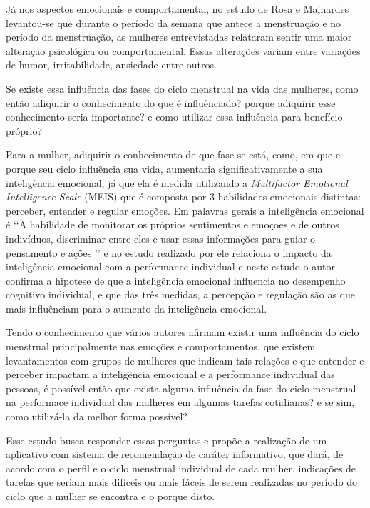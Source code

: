 Já nos aspectos emocionais e comportamental, no estudo de Rosa e Mainardes levantou-se que durante o período da semana que antece a menstruação e no período da menstruação, as mulheres entrevistadas relataram sentir uma maior alteração psicológica ou comportamental. Essas alterações variam entre variações de humor, irritabilidade, ansiedade entre outros.

Se existe essa influência das fases do ciclo menstrual na vida das mulheres, como então adiquirir o conhecimento do que é influênciado? porque adiquirir esse conhecimento seria importante? e como utilizar essa influência para benefício próprio?

Para a mulher, adiquirir o conhecimento de que fase se está, como, em que e porque seu ciclo influência sua vida, aumentaria significativamente a sua inteligência emocional, já que ela é medida utilizando a \textit{Multifactor Emotional Intelligence Scale} (MEIS) que é composta por 3 habilidades emocionais distintas: perceber, entender e regular emoções. Em palavras gerais a inteligência emocional é \lq \lq A habilidade de monitorar os próprios sentimentos e emoçoes e de outros indivíduos, discriminar entre eles e usar essas informações para guiar o pensamento e ações \rq \rq \cite{salovey1990} e no estudo realizado por  ele relaciona o impacto da inteligência emocional com a performance individual e neste estudo o autor confirma a hipotese de que a inteligência emocional influencia no desempenho cognitivo individual, e que das três medidas, a percepção e regulação são as que mais influênciam para o aumento da inteligência emocional.
  

Tendo o conhecimento que vários autores afirmam existir uma influência do ciclo menstrual principalmente nas emoções e comportamentos, que existem levantamentos com grupos de mulheres que indicam tais relações e que entender e perceber impactam a inteligência emocional e a performance individual das pessoas, é possível então que exista alguma influência da fase do ciclo menstrual na performace individual das mulheres em algumas tarefas cotidianas? e se sim, como utilizá-la da melhor forma possível? 

Esse estudo busca responder essas perguntas e propõe a realização de um aplicativo com  sistema de recomendação de caráter informativo, que dará, de acordo com o perfil e o ciclo menstrual individual de cada mulher, indicações de tarefas que seriam mais difíceis ou mais fáceis de serem realizadas no período do ciclo que a mulher se encontra e o porque disto.
 
